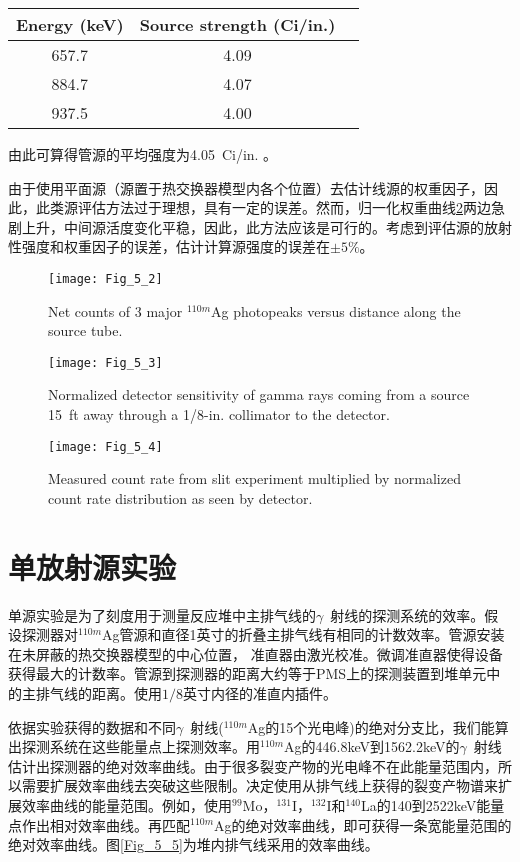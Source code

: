 \begin{tabular}[c]{ccc}
\hline
Energy (keV)  &  Source strength (Ci/in.) \\
\hline
657.7  &  4.09  \\
884.7  &  4.07  \\
937.5  &  4.00  \\
\hline
\end{tabular}

由此可算得管源的平均强度为4.05\ Ci/in. 
。

由于使用平面源（源置于热交换器模型内各个位置）去估计线源的权重因子，因此，此类源评估方法过于理想，具有一定的误差。然而，归一化权重曲线\ref{Fig_5_3}两边急剧上升，中间源活度变化平稳，因此，此方法应该是可行的。考虑到评估源的放射性强度和权重因子的误差，估计计算源强度的误差在$\pm5\%$。

\begin{figure}
\centering
\texttt{[image: Fig\_5\_2]}
\caption{Net counts of 3 major $^{110m}$Ag photopeaks versus distance along the source tube.}
\label{Fig_5_2}
\end{figure}

\begin{figure}
\centering
\texttt{[image: Fig\_5\_3]}
\caption{Normalized detector sensitivity of gamma rays coming from a source 15\ ft away through a 1/8-in. collimator to the detector.}
\label{Fig_5_3}
\end{figure}


\begin{figure}
\centering
\texttt{[image: Fig\_5\_4]}
\caption{Measured count rate from slit experiment multiplied by normalized count rate distribution as seen by detector.}
\label{Fig_5_4}
\end{figure}

\section{单放射源实验}

单源实验是为了刻度用于测量反应堆中主排气线的$\gamma$\ 射线的探测系统的效率。假设探测器对$^{110m}$Ag管源和直径1英寸的折叠主排气线有相同的计数效率。管源安装在未屏蔽的热交换器模型的中心位置， 准直器由激光校准。微调准直器使得设备获得最大的计数率。管源到探测器的距离大约等于PMS上的探测装置到堆单元中的主排气线的距离。使用$1/8$英寸内径的准直内插件。

依据实验获得的数据和不同$\gamma$\ 射线($^{110m}$Ag的15个光电峰)的绝对分支比，我们能算出探测系统在这些能量点上探测效率。用$^{110m}$Ag的446.8keV到1562.2keV的$\gamma$\ 射线估计出探测器的绝对效率曲线。由于很多裂变产物的光电峰不在此能量范围内，所以需要扩展效率曲线去突破这些限制。决定使用从排气线上获得的裂变产物谱来扩展效率曲线的能量范围。例如，使用$^{99}$Mo，$^{131}$I，$^{132}$I和$^{140}$La的140到2522keV能量点作出相对效率曲线。再匹配$^{110m}$Ag的绝对效率曲线，即可获得一条宽能量范围的绝对效率曲线。图\ref{Fig_5_5}为堆内排气线采用的效率曲线。

